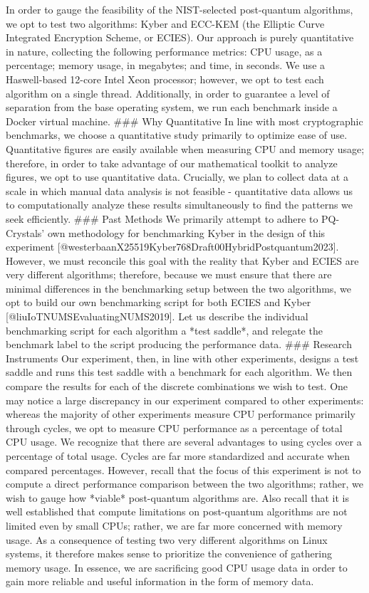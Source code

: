 \documentclass[12pt]{article}
\begin{document}
In order to gauge the feasibility of the NIST-selected post-quantum algorithms, we opt to  test two algorithms: Kyber and ECC-KEM (the Elliptic Curve Integrated Encryption Scheme, or ECIES). Our approach is purely quantitative in nature, collecting the following performance metrics: CPU usage, as a percentage; memory usage, in megabytes; and time, in seconds. We use a Haswell-based 12-core Intel Xeon processor; however, we opt to test each algorithm on a single thread.  Additionally, in order to guarantee a level of separation from the base operating system, we run each benchmark inside a Docker virtual machine. 
### Why Quantitative
In line with most cryptographic benchmarks, we choose a quantitative study primarily to optimize ease of use. Quantitative figures are easily available when measuring CPU and memory usage; therefore, in order to take advantage of our mathematical toolkit to analyze figures, we opt to use quantitative data. Crucially, we plan to collect data at a scale in which manual data analysis is not feasible - quantitative data allows us to computationally analyze these results simultaneously to find the patterns we seek efficiently. 
### Past Methods
We primarily attempt to adhere to PQ-Crystals' own methodology for benchmarking Kyber in the design of this experiment [@westerbaanX25519Kyber768Draft00HybridPostquantum2023]. However, we must reconcile this goal with the reality that Kyber and ECIES are very different algorithms; therefore, because we must ensure that there are minimal differences in the benchmarking setup between the two algorithms, we opt to build our own benchmarking script for both ECIES and Kyber [@liuIoTNUMSEvaluatingNUMS2019]. Let us describe the individual benchmarking script for each algorithm a *test saddle*, and relegate the benchmark label to the script producing the performance data. 
### Research Instruments
Our experiment, then, in line with other experiments, designs a test saddle and runs this test saddle with a benchmark for each algorithm. We then compare the results for each of the discrete combinations we wish to test. One may notice a large discrepancy in our experiment compared to other experiments: whereas the majority of other experiments measure CPU performance primarily through cycles, we opt to measure CPU performance as a percentage of total CPU usage. We recognize that there are several advantages to using cycles over a percentage of total usage. Cycles are far more standardized and accurate when compared percentages. However, recall that the focus of this experiment is not to compute a direct performance comparison between the two algorithms; rather, we wish to gauge how *viable* post-quantum algorithms are. Also recall that it is well established that compute limitations on post-quantum algorithms are not limited even by small CPUs; rather, we are far more concerned with memory usage. As a consequence of testing two very different algorithms on Linux systems, it therefore makes sense to prioritize the convenience of gathering memory usage. In essence, we are sacrificing good CPU usage data in order to gain more reliable and useful information in the form of memory data. 
\end{document}
